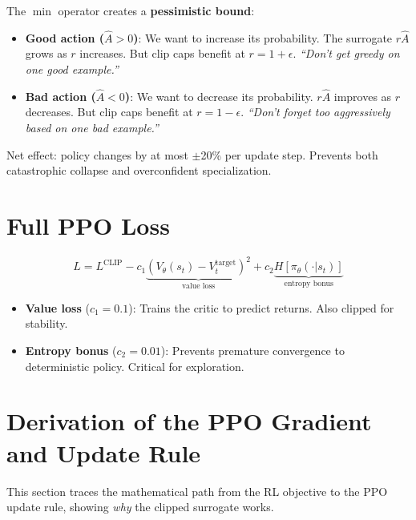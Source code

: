 \begin{intuitionbox}
The $\min$ operator creates a \textbf{pessimistic bound}:

\begin{itemize}
  \item \textbf{Good action ($\hat{A} > 0$)}: We want to increase its probability. The surrogate $r\hat{A}$ grows as $r$ increases. But clip caps benefit at $r = 1 + \epsilon$. \emph{``Don’t get greedy on one good example.''}
  \item \textbf{Bad action ($\hat{A} < 0$)}: We want to decrease its probability. $r\hat{A}$ improves as $r$ decreases. But clip caps benefit at $r = 1 - \epsilon$. \emph{``Don’t forget too aggressively based on one bad example.''}
\end{itemize}

Net effect: policy changes by at most $\pm$20\% per update step. Prevents both catastrophic collapse and overconfident specialization.
\end{intuitionbox}

\section{Full PPO Loss}
\label{full-ppo-loss}

\begin{equation}
L = L^{\text{CLIP}} - c_1 \underbrace{(V_\theta(s_t) - V^{\text{target}}_t)^2}_{\text{value loss}} + c_2 \underbrace{H[\pi_\theta(\cdot|s_t)]}_{\text{entropy bonus}}
\end{equation}

\begin{itemize}
  \item \textbf{Value loss} ($c_1 = 0.1$): Trains the critic to predict returns. Also clipped for stability.
  \item \textbf{Entropy bonus} ($c_2 = 0.01$): Prevents premature convergence to deterministic policy. Critical for exploration.
\end{itemize}

\section{Derivation of the PPO Gradient and Update Rule}
\label{derivation-of-the-ppo-gradient-and-update-rule}

This section traces the mathematical path from the RL objective to the PPO update rule, showing \emph{why} the clipped surrogate works.


